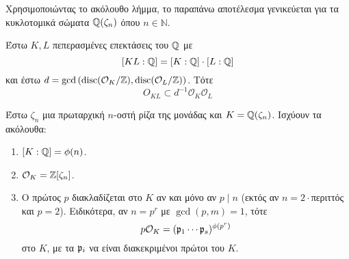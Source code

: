\noindent Χρησιμοποιώντας το ακόλουθο λήμμα, το παραπάνω αποτέλεσμα γενικεύεται για τα κυκλοτομικά σώματα $\mathbb{Q}(\zeta_n)$ όπου 
$n \in \mathbb{N}$.
\begin{lemma}
	Έστω $K,L$ πεπερασμένες επεκτάσεις του $\mathbb{Q}$ με
	$$[KL:\mathbb{Q}] = [K:\mathbb{Q}]\cdot [L:\mathbb{Q}]$$ και έστω $d = \gcd \left( \operatorname{disc}(\mathcal{O}_K/\mathbb{Z}), \operatorname{disc}(\mathcal{O}_L/\mathbb{Z})\right)$. Τότε
	$$O_{KL} \subset d^{-1} \mathcal{O}_K \mathcal{O}_L$$
\end{lemma}

\begin{prop}
	Έστω $\zeta_n$ μια πρωταρχική $n$-οστή ρίζα της μονάδας και $K= \mathbb{Q}(\zeta_n)$. Ισχύουν τα ακόλουθα:
	\begin{enumerate}
		\item $[K:\mathbb{Q}] = \phi(n)$.
		\item $\mathcal{O}_K = \mathbb{Z}[\zeta_n]$.
		\item Ο πρώτος $p$ διακλαδίζεται στο $K$ αν και μόνο αν $p\mid n$ (εκτός αν $n=2\cdot$περιττός και $p=2$). Ειδικότερα, αν $n=p^r$ με $\gcd(p,m)=1$, τότε 
		$$p \mathcal{O}_K = (\mathfrak{p}_1 \cdots \mathfrak{p}_s)^{\phi(p^r)}$$ στο $K$, με τα $\mathfrak{p}_i$ να είναι διακεκριμένοι πρώτοι του $K$. %
	\end{enumerate}
\end{prop}




